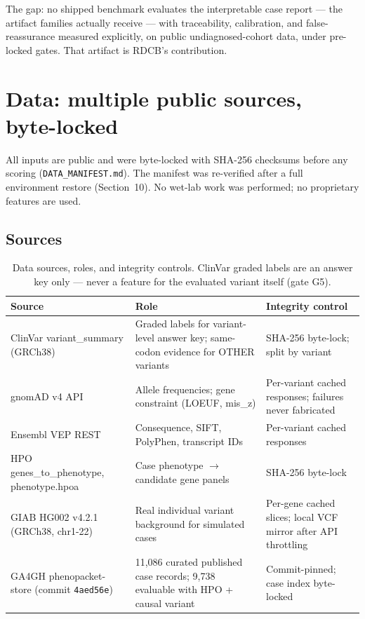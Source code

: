 \documentclass[11pt]{article}
\newcommand{\toprule}{\hline}
\newcommand{\midrule}{\hline}
\newcommand{\bottomrule}{\hline}
\begin{document}
The gap: no shipped benchmark evaluates the interpretable case report --- the
artifact families actually receive --- with traceability, calibration, and
false-reassurance measured explicitly, on public undiagnosed-cohort data, under
pre-locked gates. That artifact is RDCB's contribution.

\section{Data: multiple public sources, byte-locked}
\label{sec:data}
All inputs are public and were byte-locked with SHA-256 checksums before any scoring
(\texttt{DATA\_MANIFEST.md}). The manifest was re-verified after a full environment
restore (Section~10). No wet-lab work was performed; no proprietary features are
used.

\subsection{Sources}
\begin{table}[tb!]
\centering\small
\caption{Data sources, roles, and integrity controls. ClinVar graded labels are an
answer key only --- never a feature for the evaluated variant itself (gate G5).}
\label{tab:sources}
\begin{tabular}{p{3.3cm}p{4.8cm}p{3.9cm}}
\toprule
Source & Role & Integrity control \\
\midrule
ClinVar variant\_summary (GRCh38) & Graded labels for variant-level answer key; same-codon evidence for OTHER variants & SHA-256 byte-lock; split by variant \\
gnomAD v4 API & Allele frequencies; gene constraint (LOEUF, mis\_z) & Per-variant cached responses; failures never fabricated \\
Ensembl VEP REST & Consequence, SIFT, PolyPhen, transcript IDs & Per-variant cached responses \\
HPO genes\_to\_phenotype, phenotype.hpoa & Case phenotype $\rightarrow$ candidate gene panels & SHA-256 byte-lock \\
GIAB HG002 v4.2.1 (GRCh38, chr1-22) & Real individual variant background for simulated cases & Per-gene cached slices; local VCF mirror after API throttling \\
GA4GH phenopacket-store (commit \texttt{4aed56e}) & 11,086 curated published case records; 9,738 evaluable with HPO + causal variant & Commit-pinned; case index byte-locked \\
\bottomrule
\end{tabular}
\end{table}
\end{document}

